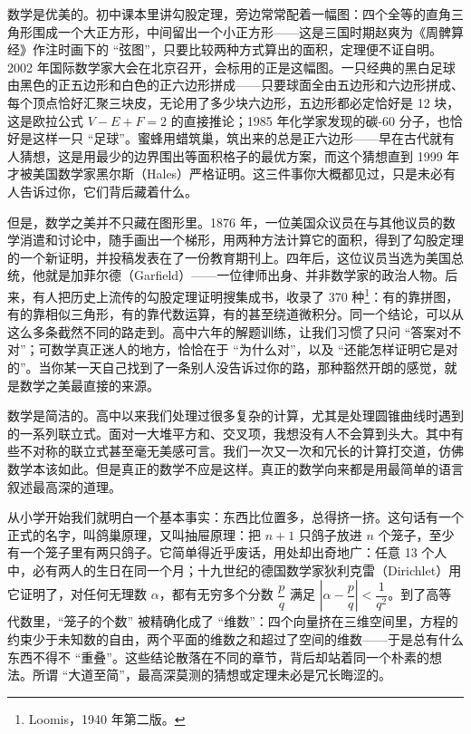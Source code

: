 \documentclass[lang=cn,10.5pt,scheme=chinese,toc=twocol,section,chinesefont=nofont,
twoside,citestyle=gb7714-2015,bibstyle=gb7714-2015]{elegantbook}
\DeclareRobustCommand{\textbf}[1]{{\lnsemiboldlatin\lnsemiboldcjk #1}}
\numberwithin{equation}{section}   %
\begin{document}
{  \textbf{数学是优美的。}初中课本里讲勾股定理，旁边常常配着一幅图：四个全等的直角三角形围成一个大正方形，中间留出一个小正方形——这是三国时期赵爽为《周髀算经》作注时画下的 “弦图”，只要比较两种方式算出的面积，定理便不证自明。2002 年国际数学家大会在北京召开，会标用的正是这幅图。一只经典的黑白足球由黑色的正五边形和白色的正六边形拼成——只要球面全由五边形和六边形拼成、每个顶点恰好汇聚三块皮，无论用了多少块六边形，五边形都必定恰好是 12 块，这是欧拉公式 $V-E+F=2$ 的直接推论；1985 年化学家发现的碳-60 分子，也恰好是这样一只 “足球”。蜜蜂用蜡筑巢，筑出来的总是正六边形——早在古代就有人猜想，这是用最少的边界围出等面积格子的最优方案，而这个猜想直到 1999 年才被美国数学家黑尔斯（Hales）严格证明。这三件事你大概都见过，只是未必有人告诉过你，它们背后藏着什么。

  但是，数学之美并不只藏在图形里。1876 年，一位美国众议员在与其他议员的数学消遣和讨论中，随手画出一个梯形，用两种方法计算它的面积，得到了勾股定理的一个新证明，并投稿发表在了一份教育期刊上。四年后，这位议员当选为美国总统，他就是加菲尔德（Garfield）——一位律师出身、并非数学家的政治人物。后来，有人把历史上流传的勾股定理证明搜集成书，收录了 370 种\footnote{Loomis，1940 年第二版。}：有的靠拼图，有的靠相似三角形，有的靠代数运算，有的甚至绕道微积分。同一个结论，可以从这么多条截然不同的路走到。高中六年的解题训练，让我们习惯了只问 “答案对不对”；可数学真正迷人的地方，恰恰在于 “为什么对”，以及 “还能怎样证明它是对的”。当你某一天自己找到了一条别人没告诉过你的路，那种豁然开朗的感觉，就是数学之美最直接的来源。

  \textbf{数学是简洁的。}高中以来我们处理过很多复杂的计算，尤其是处理圆锥曲线时遇到的一系列联立式。面对一大堆平方和、交叉项，我想没有人不会算到头大。其中有些不对称的联立式甚至毫无美感可言。我们一次又一次和冗长的计算打交道，仿佛数学本该如此。但是真正的数学不应是这样。真正的数学向来都是用最简单的语言叙述最高深的道理。

  从小学开始我们就明白一个基本事实：东西比位置多，总得挤一挤。这句话有一个正式的名字，叫鸽巢原理，又叫抽屉原理：把 $n+1$ 只鸽子放进 $n$ 个笼子，至少有一个笼子里有两只鸽子。它简单得近乎废话，用处却出奇地广：任意 13 个人中，必有两人的生日在同一个月；十九世纪的德国数学家狄利克雷（Dirichlet）用它证明了，对任何无理数 $\alpha$，都有无穷多个分数 $\dfrac{p}{q}$ 满足 $\left|\alpha-\dfrac{p}{q}\right|<\dfrac{1}{q^2}$。到了高等代数里，“笼子的个数” 被精确化成了 “维数”：四个向量挤在三维空间里，方程的约束少于未知数的自由，两个平面的维数之和超过了空间的维数——于是总有什么东西不得不 “重叠”。这些结论散落在不同的章节，背后却站着同一个朴素的想法。所谓 “大道至简”，最高深莫测的猜想或定理未必是冗长晦涩的。

}
\end{document}
